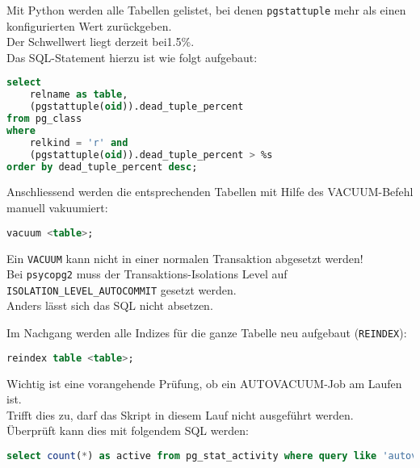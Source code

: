 \begin{flushleft}
    Mit Python werden alle Tabellen gelistet, bei denen \texttt{pgstattuple} mehr als einen konfigurierten Wert zurückgeben.\\
    Der Schwellwert liegt derzeit bei1.5\%.\\
    Das SQL-Statement hierzu ist wie folgt aufgebaut:
    \lstset{style=gra_codestyle}
    \begin{lstlisting}[language=sql, caption=Maintenance-Tool - List - Maintenance-Tool - Bloated Tables / Indices,captionpos=b,label={lst:maintenannce-tool-list-bloated-tables},breaklines=true]
select
    relname as table,
    (pgstattuple(oid)).dead_tuple_percent
from pg_class
where
    relkind = 'r' and
    (pgstattuple(oid)).dead_tuple_percent > %s
order by dead_tuple_percent desc;
    \end{lstlisting}
    Anschliessend werden die entsprechenden Tabellen mit Hilfe des VACUUM-Befehl manuell vakuumiert:
    \lstset{style=gra_codestyle}
    \begin{lstlisting}[language=sql, caption=Maintenance-Tool - VACUUM - Maintenance-Tool - Bloated Tables / Indices,captionpos=b,label={lst:maintenannce-tool-vacuum-bloated-tables},breaklines=true]
vacuum <table>;
    \end{lstlisting}
    \begin{warning}
        Ein \texttt{VACUUM} kann nicht in einer normalen Transaktion abgesetzt werden!\\
        Bei \texttt{psycopg2} muss der Transaktions-Isolations Level auf \texttt{ISOLATION\_LEVEL\_AUTOCOMMIT} gesetzt werden.\\
        Anders lässt sich das SQL nicht absetzen.
    \end{warning}
    Im Nachgang werden alle Indizes für die ganze Tabelle neu aufgebaut (\texttt{REINDEX}):
    \lstset{style=gra_codestyle}
    \begin{lstlisting}[language=sql, caption=Maintenance-Tool - REINDEX - Maintenance-Tool - Bloated Tables / Indices,captionpos=b,label={lst:maintenannce-tool-reindex-bloated-tables},breaklines=true]
reindex table <table>;
    \end{lstlisting}
\end{flushleft}
\begin{flushleft}
    Wichtig ist eine vorangehende Prüfung, ob ein \Gls{AUTOVACUUM}-Job am Laufen ist.\\
    Trifft dies zu, darf das Skript in diesem Lauf nicht ausgeführt werden.\\
    Überprüft kann dies mit folgendem SQL werden:
    \lstset{style=gra_codestyle}
    \begin{lstlisting}[language=sql, caption=Maintenance-Tool - Check AUTOVACUUM - Maintenance-Tool - Bloated Tables / Indices,captionpos=b,label={lst:maintenannce-tool-check-autovacuum-bloated-tables},breaklines=true]
select count(*) as active from pg_stat_activity where query like 'autovacuum:%';
    \end{lstlisting}
\end{flushleft}
